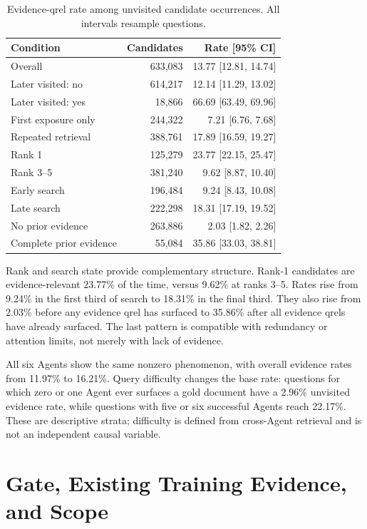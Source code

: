 \begin{table}[t]
  \caption{Evidence-qrel rate among unvisited candidate occurrences. All intervals resample questions.}
  \label{tab:conditions}
  \centering
  \small
  \begin{tabular}{lrr}
    \toprule
    Condition & Candidates & Rate [95\% CI] \\
    \midrule
    Overall & 633,083 & 13.77 [12.81, 14.74] \\
    Later visited: no & 614,217 & 12.14 [11.29, 13.02] \\
    Later visited: yes & 18,866 & 66.69 [63.49, 69.96] \\
    First exposure only & 244,322 & 7.21 [6.76, 7.68] \\
    Repeated retrieval & 388,761 & 17.89 [16.59, 19.27] \\
    Rank 1 & 125,279 & 23.77 [22.15, 25.47] \\
    Rank 3--5 & 381,240 & 9.62 [8.87, 10.40] \\
    Early search & 196,484 & 9.24 [8.43, 10.08] \\
    Late search & 222,298 & 18.31 [17.19, 19.52] \\
    No prior evidence & 263,886 & 2.03 [1.82, 2.26] \\
    Complete prior evidence & 55,084 & 35.86 [33.03, 38.81] \\
    \bottomrule
  \end{tabular}
\end{table}

Rank and search state provide complementary structure. Rank-1 candidates are evidence-relevant 23.77\% of the time, versus 9.62\% at ranks 3--5. Rates rise from 9.24\% in the first third of search to 18.31\% in the final third. They also rise from 2.03\% before any evidence qrel has surfaced to 35.86\% after all evidence qrels have already surfaced. The last pattern is compatible with redundancy or attention limits, not merely with lack of evidence.

All six Agents show the same nonzero phenomenon, with overall evidence rates from 11.97\% to 16.21\%. Query difficulty changes the base rate: questions for which zero or one Agent ever surfaces a gold document have a 2.96\% unvisited evidence rate, while questions with five or six successful Agents reach 22.17\%. These are descriptive strata; difficulty is defined from cross-Agent retrieval and is not an independent causal variable.

\section{Gate, Existing Training Evidence, and Scope}


